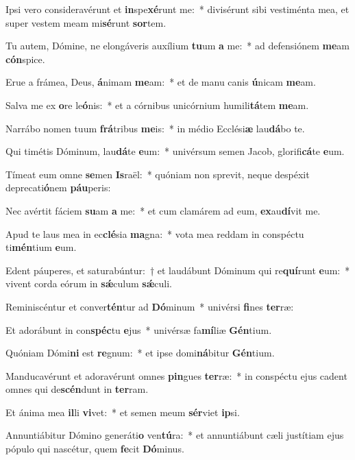 \item Ipsi vero consideravérunt et \textbf{in}spe\textbf{xé}runt me:~* divisérunt sibi vestiménta mea, et super vestem meam mi\textbf{sé}runt \textbf{sor}tem.
\item Tu autem, Dómine, ne elongáveris auxílium \textbf{tu}um \textbf{a} me:~* ad defensiónem \textbf{me}am \textbf{cón}spice.
\item Erue a frámea, Deus, \textbf{á}nimam \textbf{me}am:~* et de manu canis \textbf{ú}nicam \textbf{me}am.
\item Salva me ex \textbf{o}re le\textbf{ó}nis:~* et a córnibus unicórnium humili\textbf{tá}tem \textbf{me}am.
\item Narrábo nomen tuum \textbf{frá}tribus \textbf{me}is:~* in médio Ecclési\textbf{æ} lau\textbf{dá}bo te.
\item Qui timétis Dóminum, lau\textbf{dá}te \textbf{e}um:~* univérsum semen Jacob, glorifi\textbf{cá}te \textbf{e}um.
\item Tímeat eum omne \textbf{se}men \textbf{Is}raël:~* quóniam non sprevit, neque despéxit deprecati\textbf{ó}nem \textbf{páu}peris:
\item Nec avértit fáciem \textbf{su}am \textbf{a} me:~* et cum clamárem ad eum, \textbf{ex}au\textbf{dí}vit me.
\item Apud te laus mea in ec\textbf{clé}sia \textbf{ma}gna:~* vota mea reddam in conspéctu ti\textbf{mén}tium \textbf{e}um.
\item Edent páuperes, et saturabúntur:~† et laudábunt Dóminum qui re\textbf{quí}runt \textbf{e}um:~* vivent corda eórum in \textbf{sǽ}culum \textbf{sǽ}culi.
\item Reminiscéntur et conver\textbf{tén}tur ad \textbf{Dó}minum~* univérsi \textbf{fi}nes \textbf{ter}ræ:
\item Et adorábunt in con\textbf{spéc}tu \textbf{e}jus~* univérsæ fa\textbf{mí}liæ \textbf{Gén}tium.
\item Quóniam Dómi\textbf{ni} est \textbf{re}gnum:~* et ipse domi\textbf{ná}bitur \textbf{Gén}tium.
\item Manducavérunt et adoravérunt omnes \textbf{pin}gues \textbf{ter}ræ:~* in conspéctu ejus cadent omnes qui de\textbf{scén}dunt in \textbf{ter}ram.
\item Et ánima mea \textbf{il}li \textbf{vi}vet:~* et semen meum \textbf{sér}viet \textbf{ip}si.
\item Annuntiábitur Dómino generáti\textbf{o} ven\textbf{tú}ra:~* et annuntiábunt cæli justítiam ejus pópulo qui nascétur, quem \textbf{fe}cit \textbf{Dó}minus.
